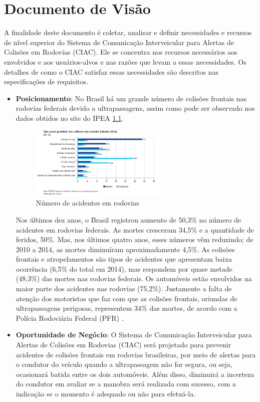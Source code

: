 \chapter{Documento de Visão}

A finalidade deste documento é coletar, analisar e definir necessidades e recursos de nível superior do Sistema de Comunicação Interveicular para Alertas de Colisões em Rodovias (CIAC). Ele se concentra nos recursos necessários aos envolvidos e aos usuários-alvos e nas razões que levam a essas necessidades. Os detalhes de como o CIAC satisfaz essas necessidades são descritos nas especificações de requisitos.

\begin{itemize}


\item \textbf{Posicionamento}:  No Brasil há um grande número de colisões frontais nas rodovias federais devido a ultrapassagens, assim como pode ser observado nos dados obtidos no site do IPEA \ref{fig:numero_acidentes}.


\begin{figure}[h!]
\centering
\includegraphics[width=250px, scale=1]{figuras/numero_acidentes}
\caption{Número de acidentes em rodovias}
\label{fig:numero_acidentes}
\end{figure}

Nos últimos dez anos, o Brasil registrou aumento de 50,3\% no número de acidentes em rodovias federais. As mortes cresceram
34,5\% e a quantidade de feridos, 50\%. Mas, nos últimos quatro anos, esses números vêm reduzindo; de 2010 a 2014, as mortes
diminuíram aproximadamente 4,5\%. As colisões frontais e atropelamentos são tipos de acidentes que apresentam baixa
 ocorrência (6,5\% do total em 2014), mas respondem por quase metade (48,3\%) das mortes nas rodovias federais. Os
 automóveis estão envolvidos na maior parte dos acidentes nas rodovias (75,2\%). Justamente a falta de atenção dos
 motoristas que faz com que as colisões frontais, oriundas de ultrapassagens perigosas, representem 34\% das mortes, de
 acordo com a Polícia Rodoviária Federal (PFR) \cite{ipea3}.

 \item \textbf{Oportunidade de Negócio}: O Sistema de Comunicação Interveicular para Alertas de Colisões em Rodovias (CIAC) será projetado para prevenir acidentes de colisões  frontais em rodovias brasileiras, por meio de alertas para o condutor do veículo quando a ultrapassagem não for segura, ou seja, ocasionará batida entre os dois automóveis. Além disso, diminuirá a incerteza do condutor em avaliar se a manobra será realizada com sucesso, com a indicação se o momento é adequado ou não para efetuá-la.


\end{itemize}

